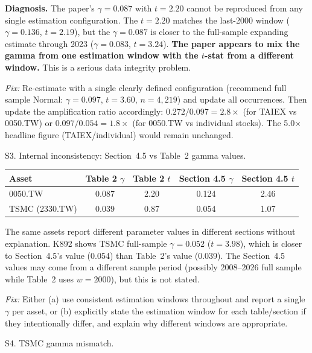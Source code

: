 \documentclass[12pt,a4paper]{article}
\begin{document}
\textbf{Diagnosis.} The paper's $\gamma = 0.087$ with $t = 2.20$ cannot be reproduced from any single estimation configuration. The $t = 2.20$ matches the last-2000 window ($\gamma = 0.136$, $t = 2.19$), but the $\gamma = 0.087$ is closer to the full-sample expanding estimate through 2023 ($\gamma = 0.083$, $t = 3.24$). \textbf{The paper appears to mix the gamma from one estimation window with the $t$-stat from a different window.} This is a serious data integrity problem.

\textit{Fix:} Re-estimate with a single clearly defined configuration (recommend full sample Normal: $\gamma = 0.097$, $t = 3.60$, $n = 4{,}219$) and update all occurrences. Then update the amplification ratio accordingly: $0.272 / 0.097 = 2.8\times$ (for TAIEX vs 0050.TW) or $0.097 / 0.054 = 1.8\times$ (for 0050.TW vs individual stocks). The 5.0$\times$ headline figure (TAIEX/individual) would remain unchanged.

\bigskip

\textcolor{errorred}{S3. Internal inconsistency: Section~4.5 vs Table~2 gamma values.}

\begin{center}
\begin{tabular}{lcccc}
\toprule
Asset & Table 2 $\gamma$ & Table 2 $t$ & Section 4.5 $\gamma$ & Section 4.5 $t$ \\
\midrule
0050.TW & 0.087 & 2.20 & 0.124 & 2.46 \\
TSMC (2330.TW) & 0.039 & 0.87 & 0.054 & 1.07 \\
\bottomrule
\end{tabular}
\end{center}

The same assets report different parameter values in different sections without explanation. K892 shows TSMC full-sample $\gamma = 0.052$ ($t = 3.98$), which is closer to Section~4.5's value (0.054) than Table~2's value (0.039). The Section~4.5 values may come from a different sample period (possibly 2008--2026 full sample while Table~2 uses $w=2000$), but this is not stated.

\textit{Fix:} Either (a) use consistent estimation windows throughout and report a single $\gamma$ per asset, or (b) explicitly state the estimation window for each table/section if they intentionally differ, and explain why different windows are appropriate.

\bigskip

\textcolor{errorred}{S4. TSMC gamma mismatch.}
\end{document}

